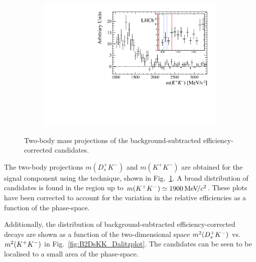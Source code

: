 \begin{figure}[!h]
\begin{subfigure}[t]{0.4\textwidth}
    \end{subfigure}
    \begin{subfigure}[t]{0.4\textwidth}
        \includegraphics[width=1.0\textwidth]{figs/B2DsKK/phi_mass_sweighted.pdf}
    \end{subfigure}
    \caption{Two-body mass projections of the background-subtracted efficiency-corrected \decay{\Bp}{\Dsp\Kp\Km} candidates.}
    \label{fig:B2DsKK_twobodyprojections}
\end{figure}

The two-body projections $m(D_{s}^{+}K^{-})$ and $m(K^{+}K^{-})$ are obtained for the signal component using the \sPlot technique, shown in Fig.~\ref{fig:B2DsKK_twobodyprojections}. A broad distribution of candidates is found in the region up to $m({{K}^+}{{K}^-}) \simeq 1900 {\mathrm{\,Me\kern -0.1em V\!/}c^2}$. These plots have been corrected to account for the variation in the relative efficiencies as a function of the phase-space.



Additionally, the distribution of background-subtracted efficiency-corrected \decay{\Bp}{\Dsp\Kp\Km} decays are shown as a function of the two-dimensional space $m^{2}({{D}^+_{s}}{{K}^-})$ vs. $m^{2}({{K}^+}{{K}^-})$ in Fig.~\ref{fig:B2DsKK_Dalitzplot}. The candidates can be seen to be localised to a small area of the phase-space. 

